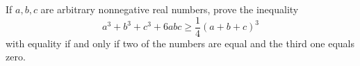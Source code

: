 If $a,b,c$ are arbitrary nonnegative real numbers, prove the inequality
$$a^3+b^3+c^3+6abc\ge\frac14(a+b+c)^3$$with equality if and only if two of the numbers are equal and the third one equals zero.